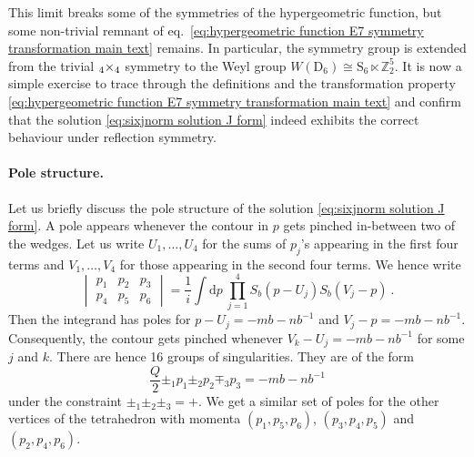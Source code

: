 \documentclass[12pt,a4paper]{article}
\newcommand{\be}{\begin{equation}}
\newcommand{\ee}{\end{equation}}
\newcommand\ZZ{\mathbb{Z}}
\let\S\relax
\DeclareMathOperator\S{S}
\newcommand{\sixjnorm}[6]{\begin{vmatrix}
#1 & #2 & #3 \\
#4 & #5 & #6
\end{vmatrix}
}
\begin{document}
This limit breaks some of the symmetries of the hypergeometric function, but some non-trivial remnant of eq.~\eqref{eq:hypergeometric function E7 symmetry transformation main text} remains. In particular, the symmetry group is extended from the trivial $\S_4 \times \S_4$ symmetry to the Weyl group $W(\mathrm{D}_6)\cong \mathrm{S}_6 \ltimes \ZZ_2^5$. It is now a simple exercise to trace through the definitions and the transformation property \eqref{eq:hypergeometric function E7 symmetry transformation main text} and confirm that the solution \eqref{eq:sixjnorm solution J form} indeed exhibits the correct behaviour under reflection symmetry.

\paragraph{Pole structure.} Let us briefly discuss the pole structure of the solution \eqref{eq:sixjnorm solution J form}.
A pole appears whenever the contour in $p$ gets pinched in-between two of the wedges. Let us write $U_1,\dots,U_4$ for the sums of $p_j$'s appearing in the first four terms and $V_1,\dots,V_4$ for those appearing in the second four terms. We hence write
\be  
\sixjnorm{p_1}{p_2}{p_3}{p_4}{p_5}{p_6}=\frac{1}{i} \int \mathrm{d}p\ \prod_{j=1}^4 S_b(p-U_j)S_b(V_j-p)\ .
\ee
Then the integrand has poles for $p-U_j=-m b-n b^{-1}$ and $V_j-p=-m b-n b^{-1}$. Consequently, the contour gets pinched whenever $V_k-U_j=-m b-n b^{-1}$ for some $j$ and $k$. There are hence 16 groups of singularities. They are of the form
\be  
\frac{Q}{2}\pm_1 p_1 \pm_2 p_2 \mp_3 p_3=-m b-n b^{-1} \label{eq:sixjnorm poles}
\ee
under the constraint $\pm_1 \pm_2 \pm_3=+$. We get a similar set of poles for the other vertices of the tetrahedron with momenta $(p_1,p_5,p_6)$, $(p_3,p_4,p_5)$ and $(p_2, p_4, p_6)$.
\end{document}

